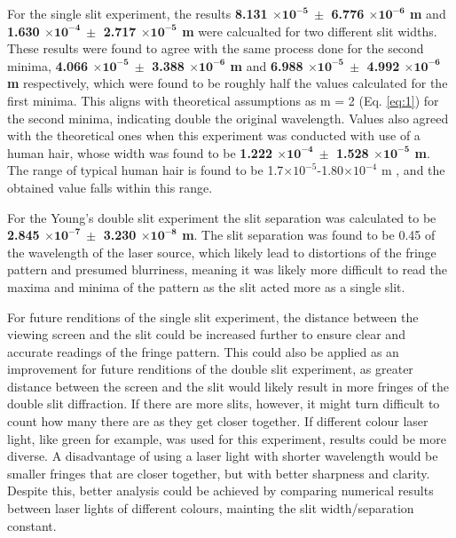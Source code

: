 \documentclass[12pt]{article}
\begin{document}
For the single slit experiment, the results \textbf{8.131 $\mathbf{\times 10^{-5} \: \pm}$ 6.776 $\mathbf{\times 10^{-6}}$ m} and \textbf{1.630 $\mathbf{\times 10^{-4} \: \pm}$ 2.717 $\mathbf{\times 10^{-5}}$ m} were calcualted for two different slit widths.
These results were found to agree with the same process done for the second minima, \textbf{4.066 $\mathbf{\times 10^{-5} \: \pm}$ 3.388 $\mathbf{\times 10^{-6}}$ m} and \textbf{6.988 $\mathbf{\times 10^{-5} \: \pm}$ 4.992 $\mathbf{\times 10^{-6}}$ m} respectively, which were found to be 
roughly half the values calculated for the first minima. This aligns with theoretical assumptions as m = 2 (Eq. \ref{eq:1}) for the second minima, indicating double the original wavelength.
Values also agreed with the theoretical ones when this experiment was conducted with use of a human hair, whose width was found to be \textbf{1.222 $\mathbf{\times 10^{-4} \: \pm}$ 1.528 $\mathbf{\times 10^{-5}}$ m}. The range of typical human hair is found to be 1.7$\times 10^{-5}$-1.80$\times 10^{-4}$ m \cite{hairwidth},
and the obtained value falls within this range.

For the Young's double slit experiment the slit separation was calculated to be \textbf{2.845 $\mathbf{\times 10^{-7} \: \pm}$ 3.230 $\mathbf{\times 10^{-8}}$ m}. The slit separation was found to be 0.45 of the wavelength of the laser source, which likely lead to distortions of the fringe pattern and presumed blurriness, 
meaning it was likely more difficult to read the maxima and minima of the pattern as the slit acted more as a single slit.

For future renditions of the single slit experiment, the distance between the viewing screen and the slit could be increased further to ensure clear and accurate readings of the fringe pattern. This could also be applied as an improvement for future renditions of the double slit experiment,
as greater distance between the screen and the slit would likely result in more fringes of the double slit diffraction. If there are more slits, however, it might turn difficult to count how many there are as they get closer together. If different colour laser light, like green for example, was used for this experiment,
results could be more diverse. A disadvantage of using a laser light with shorter wavelength would be smaller fringes that are closer together, but with better sharpness and clarity. Despite this, better analysis could be achieved by comparing numerical results between laser lights of different colours, mainting the slit width/separation
constant.

\newpage



 \label{sec:ref}

\vspace{1.5cm}

\listoffigures

\listoftables
\end{document}
